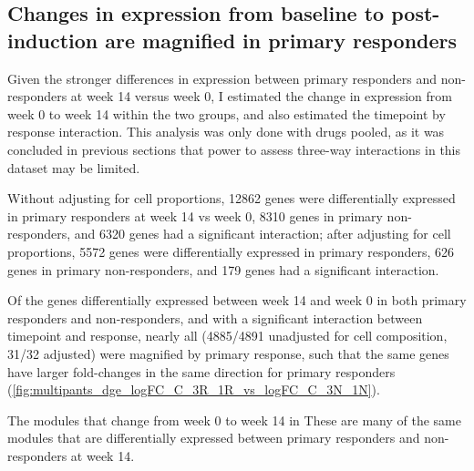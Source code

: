 \begin{outline}
\subsection{Changes in expression from baseline to post-induction are magnified in primary responders}

Given the stronger differences in expression between primary responders and non-responders at week 14 versus week 0,
I estimated the change in expression from week 0 to week 14 within the two groups, and also estimated the timepoint by response interaction.
This analysis was only done with drugs pooled, as it was concluded in previous sections that power to assess three-way interactions in this dataset may be limited.

Without adjusting for cell proportions, 
12862 genes were differentially expressed in primary responders at week 14 vs week 0,
8310 genes in primary non-responders,
and 6320 genes had a significant interaction;
after adjusting for cell proportions, 
5572 genes were differentially expressed in primary responders,
626 genes in primary non-responders,
and 179 genes had a significant interaction.

Of the genes differentially expressed between week 14 and week 0 in both primary responders and non-responders,
and with a significant interaction between timepoint and response, 
nearly all (4885/4891 unadjusted for cell composition, 31/32 adjusted) were magnified by primary response,
such that the same genes have larger fold-changes in the same direction for primary responders (\autoref{fig:multipants_dge_logFC_C_3R_1R_vs_logFC_C_3N_1N}).

The modules that change from week 0 to week 14 in 
These are many of the same modules that are differentially expressed between primary responders and non-responders at week 14.


%


\end{outline}
